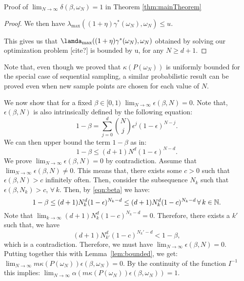 \begin{subsection}{Proof of  $\lim_{N \to \infty}\delta(\beta, \omega_N) = 1$ in Theorem \ref{thm:mainTheorem}}
\begin{proof}
We then have $\lambda_{\max}((1+\eta)\gamma^{*}(\omega_N), \omega_N) \leq u$.

This gives us that $\lamda_{\max}((1+\eta)\gamma^{*}(\omega_N), \omega_N)$ obtained by solving our optimization problem [cite?] is bounded by u, for any $N \geq d+1$.


\end{proof}

Note that, even though we proved that $\kappa(P(\omega_N))$ is uniformly bounded for the special case of sequential sampling, a similar probabilistic result can be proved even when new sample points are chosen for each value of $N$.

We now show that for a fixed $\beta \in [0,1)$ $\lim_{N \to \infty} \epsilon(\beta, N) = 0.$ Note that, $\epsilon(\beta, N)$ is also intrinsically defined by the following equation:
$$1-\beta = \sum_{j=0}^d {{N}\choose{j}} \epsilon^j (1-\epsilon)^{N-j}.$$
We can then upper bound the term $1-\beta$ as in:
\begin{equation}\label{eqn:beta}1-\beta \leq  (d+1)N^d (1-\epsilon)^{N-d}.\end{equation}
We prove $\lim_{N \to \infty} \epsilon(\beta, N) = 0$ by contradiction. Assume that $\lim_{N \to \infty} \epsilon(\beta, N) \not= 0$. This means that, there exists some $c > 0$ such that $\epsilon(\beta, N) > c$ infinitely often. Then, consider the subsequence $N_k$ such that $\epsilon(\beta, N_k) > c$, $\forall\, k.$ Then, by \eqref{eqn:beta} we have:
\begin{equation*}1-\beta\leq  (d+1)N_k^d (1-\epsilon)^{N_k-d} \leq (d+1)N_k^d (1-c)^{N_k-d}\, \forall\,k \in \mathbb{N}. 
\end{equation*}
Note that $\lim_{k \to \infty}(d+1)N_k^d (1-c)^{N_k-d} = 0.$ Therefore, there exists a $k'$ such that, we have $$(d+1)N_{k'}^d (1-c)^{N_k'-d} < 1 - \beta,$$ which is a contradiction. Therefore, we must have  $\lim_{N \to \infty} \epsilon (\beta, N) = 0$. Putting together this with Lemma~\ref{lem:bounded}, we get:
\mbox{$\lim_{N \to \infty} m \kappa(P(\omega_N))\epsilon(\beta, \omega_N) = 0.$} By the continuity of the function $I^{-1}$ this implies: $\lim_{N \to \infty} \alpha(m \kappa(P(\omega_N))\epsilon(\beta, \omega_N)) = 1.$
\end{subsection}




